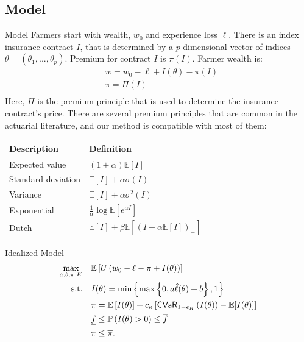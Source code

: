 \documentclass{beamer}
\begin{document}
\subsection{Model}
\begin{frame}{Model}
    Farmers start with wealth, $w_0$ and experience loss $\ell$. There is an index insurance contract $I$, that is determined by a $p$ dimensional vector of indices $\theta = (\theta_1,...,\theta_p)$. Premium for contract $I$ is $\pi(I)$. Farmer wealth is: 
    \begin{align*}
       & w = w_0 -\ell + I(\theta) -\pi(I)\\
       & \pi = \Pi(I)\\
    \end{align*}
    Here, $\Pi$ is the premium principle that is used to determine the insurance contract's price. There are several premium principles that are common in the actuarial literature, and our method is compatible with most of them:
    \begin{table}[h!]
        \centering
        \begin{tabular}{ll}
        Description & Definition \\ \hline
        Expected value       & $(1+\alpha)\mathbb{E}[I]$           \\
        Standard deviation   & $\mathbb{E}[I] + \alpha \sigma(I)$       \\
        Variance             & $\mathbb{E}[I] + \alpha \sigma^2(I)$      \\
        Exponential          & $\frac{1}{\alpha} \log \mathbb{E}[e^{\alpha I}]$    \\
        Dutch                &  $\mathbb{E}[I] + \beta \mathbb{E}[(I-\alpha \mathbb{E}[I])_+]$                   \\ \hline
        \end{tabular}
        \end{table}
\end{frame}

\begin{frame}{Idealized Model}
\label{ideal-model}
\begin{align}
    \max_{a,b,\pi, K}  & \quad \mathbb{E} \left [ U\left ( w_0 - \ell - \pi + I(\theta) \right ) \right ] \label{cons-objective}\\
    \text{s.t.} & \quad I(\theta) =  \min \left \{\max \left \{0,a\hat{\ell}(\theta) + b \right \}, 1 \right \}\label{cons-contract}\\
    & \quad \pi = \mathbb{E}\left [ I(\theta) \right ] + c_{\kappa} \left[ {\sf CVaR}_{1-\epsilon_K}\left ( I(\theta)\right )  - \mathbb{E}[I(\theta)]  \right] \\
    & \quad \underline{f} \leq \mathbb{P}\left ( I(\theta) > 0 \right ) \leq \overline{f} \label{cons-frequency}\\
    &\quad \pi \leq \overline{\pi}.\label{cons-capital}
\end{align}
\end{frame}
\end{document}
